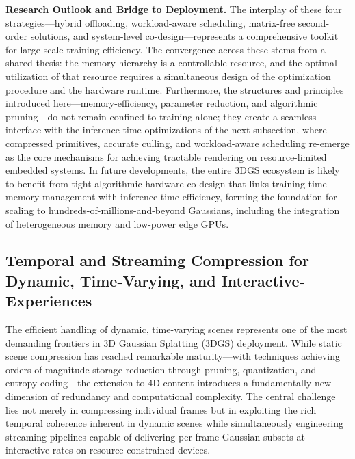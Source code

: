 \documentclass[11pt,a4paper]{article}
\begin{document}
\textbf{Research Outlook and Bridge to Deployment.} The interplay of these four strategies---hybrid offloading, workload-aware scheduling, matrix-free second-order solutions, and system-level co-design---represents a comprehensive toolkit for large-scale training efficiency. The convergence across these stems from a shared thesis: the memory hierarchy is a controllable resource, and the optimal utilization of that resource requires a simultaneous design of the optimization procedure and the hardware runtime. Furthermore, the structures and principles introduced here---memory-efficiency, parameter reduction, and algorithmic pruning---do not remain confined to training alone; they create a seamless interface with the inference-time optimizations of the next subsection, where compressed primitives, accurate culling, and workload-aware scheduling re-emerge as the core mechanisms for achieving tractable rendering on resource-limited embedded systems. In future developments, the entire 3DGS ecosystem is likely to benefit from tight algorithmic-hardware co-design that links training-time memory management with inference-time efficiency, forming the foundation for scaling to hundreds-of-millions-and-beyond Gaussians, including the integration of heterogeneous memory and low-power edge GPUs.


\subsection{Temporal and Streaming Compression for Dynamic, Time-Varying, and Interactive-Experiences}


The efficient handling of dynamic, time-varying scenes represents one of the most demanding frontiers in 3D Gaussian Splatting (3DGS) deployment. While static scene compression has reached remarkable maturity---with techniques achieving orders-of-magnitude storage reduction through pruning, quantization, and entropy coding---the extension to 4D content introduces a fundamentally new dimension of redundancy and computational complexity. The central challenge lies not merely in compressing individual frames but in exploiting the rich temporal coherence inherent in dynamic scenes while simultaneously engineering streaming pipelines capable of delivering per-frame Gaussian subsets at interactive rates on resource-constrained devices.
\end{document}
